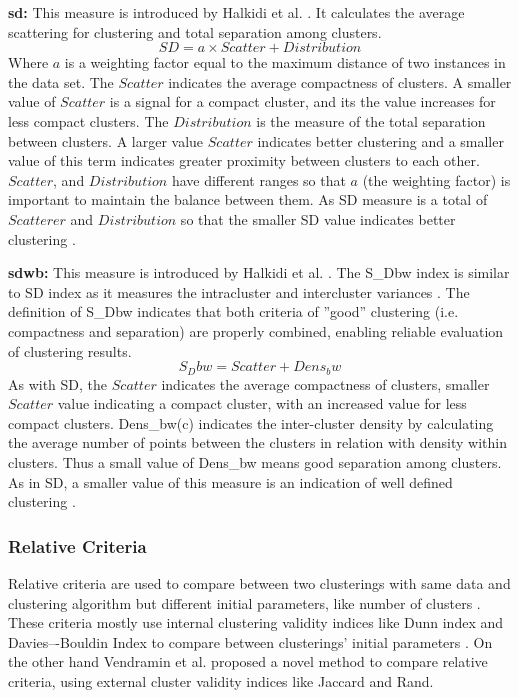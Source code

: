 \textbf{\acrshort{sd}: } This measure is introduced by Halkidi et al. \cite{Halkidi2000}. It calculates the average scattering for clustering and total separation among clusters. 
\begin{equation*}
SD = a \times Scatter + Distribution 
\end{equation*}
Where $a$ is a weighting factor equal to the maximum distance of two instances in the data set. The $Scatter$ indicates the average compactness of clusters. A smaller value of $Scatter$ is a signal for a compact cluster, and its the value increases for less compact clusters. The $Distribution$ is the measure of the total separation between clusters. A larger value $Scatter$ indicates better clustering and a smaller value of this term indicates greater proximity between clusters to each other. $Scatter$, and $Distribution$ have different ranges so that $a$ (the weighting factor) is important to maintain the balance between them. As SD measure is a total of $Scatterer$ and $Distribution$ so that the smaller SD value indicates better clustering \cite{Halkidi2000}.


\textbf{\acrshort{sdwb}:} This measure is introduced by Halkidi et al. \cite{Halkidi}. The S\_Dbw index is similar to SD index as it measures the intracluster and intercluster variances \cite{Rendon2011}. The definition of S\_Dbw indicates that both criteria of ''good'' clustering (i.e. compactness and separation) are properly combined, enabling reliable evaluation of clustering results. 
\begin{equation*}
S_Dbw = Scatter + Dens_bw
\end{equation*}
 As with SD, the $Scatter$ indicates the average compactness of clusters, smaller $Scatter$ value indicating a compact cluster, with an increased value for less compact clusters. Dens\_bw(c) indicates the inter-cluster density by calculating the average number of points between the clusters in relation with density within clusters. Thus a small value of Dens\_bw means good separation among clusters. As in SD, a smaller value of this measure is an indication of well defined clustering \cite{Halkidi}.


\subsubsection{Relative Criteria}

Relative criteria are used to compare between two clusterings with same data and clustering algorithm but different initial parameters, like number of clusters \cite{Halkidi2002}. These criteria mostly use internal clustering validity indices like Dunn index and Davies–-Bouldin Index to compare between clusterings' initial parameters \cite{Jain1988}. On the other hand Vendramin et al. \cite{Vendramin2010} proposed a novel method to compare relative criteria, using external cluster validity indices like Jaccard and Rand.



